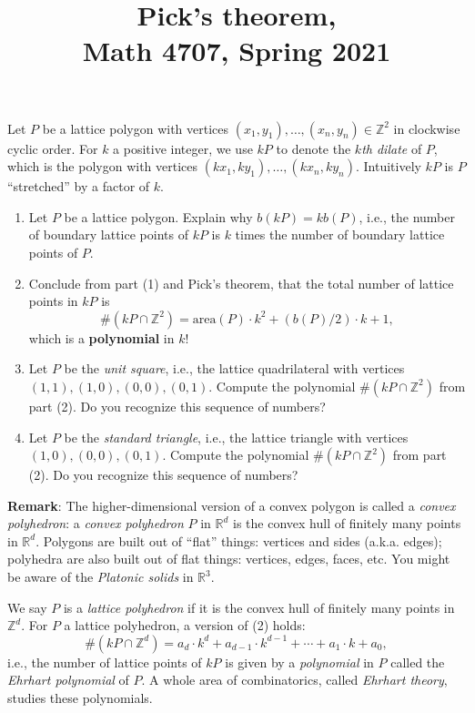 \documentclass[11pt]{article}
\title{Pick's theorem, \\Math 4707, Spring 2021}
\date{}
\begin{document}
\maketitle

\thispagestyle{empty}

\vspace{-0.8cm}

Let $P$ be a lattice polygon with vertices $(x_1,y_1),\ldots, (x_n,y_n) \in \mathbb{Z}^2$ in clockwise cyclic order. For $k$ a positive integer, we use $kP$ to denote the \emph{$k$th dilate} of $P$, which is the polygon with vertices $(kx_1,ky_1),\ldots, (kx_n,ky_n)$. Intuitively $kP$ is $P$ ``stretched'' by a factor of $k$.

\begin{enumerate}

\item Let $P$ be a lattice polygon. Explain why $b(kP)=kb(P)$, i.e., the number of boundary lattice points of $kP$ is $k$ times the number of boundary lattice points of $P$.
\item Conclude from part (1) and Pick's theorem, that the total number of lattice points in $kP$ is 
\[ \#(kP\cap \mathbb{Z}^2) = \mathrm{area}(P) \cdot k^2 + (b(P)/2) \cdot k + 1,\]
which is a {\bf polynomial} in $k$!
\item Let $P$ be the \emph{unit square}, i.e., the lattice quadrilateral with vertices $(1,1), (1,0), (0,0), (0,1)$. Compute the polynomial $\#(kP\cap \mathbb{Z}^2) $ from part (2). Do you recognize this sequence of numbers?
\item Let $P$ be the \emph{standard triangle}, i.e., the lattice triangle with vertices $(1,0), (0,0), (0,1)$. Compute the polynomial $\#(kP\cap \mathbb{Z}^2) $ from part (2). Do you recognize this sequence of numbers?

\end{enumerate}

\vspace{-0.2cm}

{\bf Remark}: The higher-dimensional version of a convex polygon is called a \emph{convex polyhedron}: a \emph{convex polyhedron} $P$ in $\mathbb{R}^d$ is the convex hull of finitely many points in $\mathbb{R}^d$. Polygons are built out of ``flat'' things: vertices and sides (a.k.a. edges); polyhedra are also built out of flat things: vertices, edges, faces, etc. You might be aware of the \emph{Platonic solids} in $\mathbb{R}^3$.

We say $P$ is a \emph{lattice polyhedron} if it is the convex hull of finitely many points in $\mathbb{Z}^d$. For $P$ a lattice polyhedron, a version of (2) holds:
\[ \#(kP\cap \mathbb{Z}^d) = a_d \cdot k^d + a_{d-1} \cdot k^{d-1} + \cdots + a_1 \cdot k + a_0,\]
i.e., the number of lattice points of $kP$ is given by a \emph{polynomial} in $P$ called the \emph{Ehrhart polynomial} of $P$. A whole area of combinatorics, called \emph{Ehrhart theory}, studies these polynomials.
\end{document}

